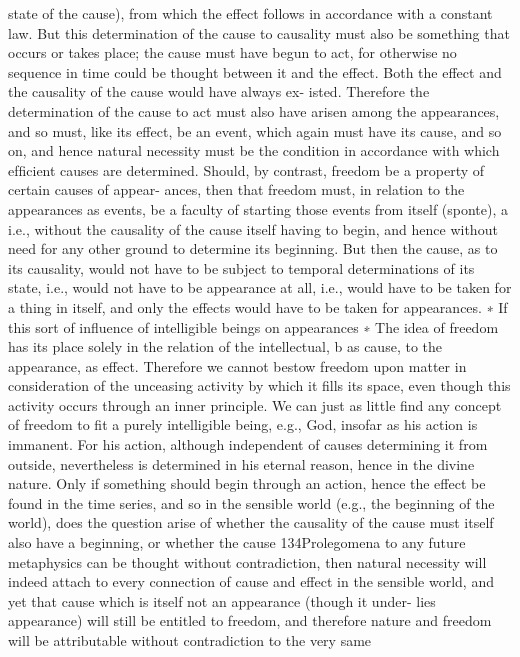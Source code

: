 state of the cause), from which the effect follows in accordance with a
constant law. But this determination of the cause to causality must also
be something that occurs or takes place; the cause must have begun to act,
for otherwise no sequence in time could be thought between it and the
effect. Both the effect and the causality of the cause would have always ex-
isted. Therefore the determination of the cause to act must also have arisen
among the appearances, and so must, like its effect, be an event, which
again must have its cause, and so on, and hence natural necessity must be
the condition in accordance with which efﬁcient causes are determined.
Should, by contrast, freedom be a property of certain causes of appear-
ances, then that freedom must, in relation to the appearances as events,
be a faculty of starting those events from itself (sponte), a i.e., without the
causality of the cause itself having to begin, and hence without need for
any other ground to determine its beginning. But then the cause, as to its
causality, would not have to be subject to temporal determinations of its
state, i.e., would not have to be appearance at all, i.e., would have to be
taken for a thing in itself, and only the effects would have to be taken for
appearances. ∗ If this sort of inﬂuence of intelligible beings on appearances
∗
The idea of freedom has its place solely in the relation of the intellectual, b as
cause, to the appearance, as effect. Therefore we cannot bestow freedom upon
matter in consideration of the unceasing activity by which it ﬁlls its space,
even though this activity occurs through an inner principle. We can just as
little ﬁnd any concept of freedom to ﬁt a purely intelligible being, e.g., God,
insofar as his action is immanent. For his action, although independent of
causes determining it from outside, nevertheless is determined in his eternal
reason, hence in the divine nature. Only if something should begin through an
action, hence the effect be found in the time series, and so in the sensible
world (e.g., the beginning of the world), does the question arise of whether the
causality of the cause must itself also have a beginning, or whether the cause
134Prolegomena to any future metaphysics
can be thought without contradiction, then natural necessity will indeed
attach to every connection of cause and effect in the sensible world,
and yet that cause which is itself not an appearance (though it under-
lies appearance) will still be entitled to freedom, and therefore nature
and freedom will be attributable without contradiction to the very same
